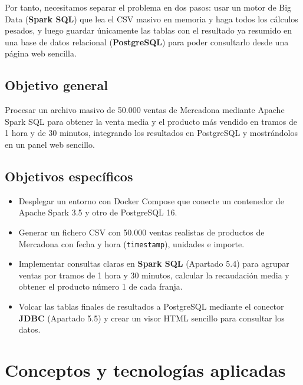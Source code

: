 \documentclass[a4paper,12pt]{article}
\begin{document}
Por tanto, necesitamos separar el problema en dos pasos: usar un motor de Big Data (\textbf{Spark SQL}) que lea el CSV masivo en memoria y haga todos los cálculos pesados, y luego guardar únicamente las tablas con el resultado ya resumido en una base de datos relacional (\textbf{PostgreSQL}) para poder consultarlo desde una página web sencilla.

\subsection{Objetivo general}
Procesar un archivo masivo de 50.000 ventas de Mercadona mediante Apache Spark SQL para obtener la venta media y el producto más vendido en tramos de 1 hora y de 30 minutos, integrando los resultados en PostgreSQL y mostrándolos en un panel web sencillo.

\subsection{Objetivos específicos}
\begin{itemize}[leftmargin=1.0cm]
  \item Desplegar un entorno con Docker Compose que conecte un contenedor de Apache Spark 3.5 y otro de PostgreSQL 16.
  \item Generar un fichero CSV con 50.000 ventas realistas de productos de Mercadona con fecha y hora (\texttt{timestamp}), unidades e importe.
  \item Implementar consultas claras en \textbf{Spark SQL} (Apartado 5.4) para agrupar ventas por tramos de 1 hora y 30 minutos, calcular la recaudación media y obtener el producto número 1 de cada franja.
  \item Volcar las tablas finales de resultados a PostgreSQL mediante el conector \textbf{JDBC} (Apartado 5.5) y crear un visor HTML sencillo para consultar los datos.
\end{itemize}

\section{Conceptos y tecnologías aplicadas}
\end{document}
